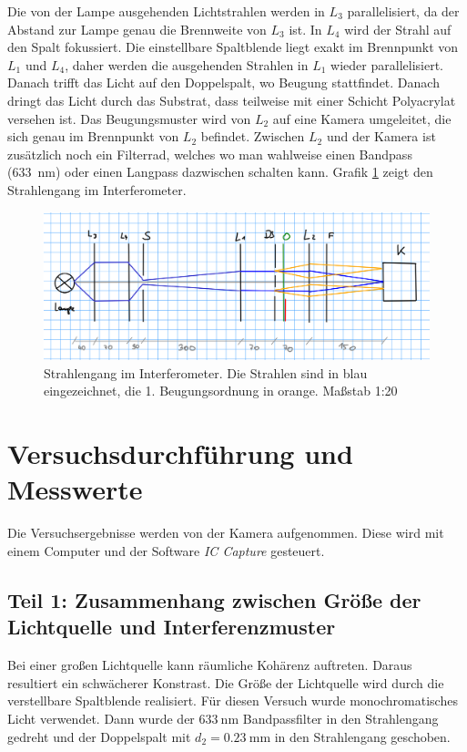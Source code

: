 \documentclass{article}
\begin{document}
Die von der Lampe ausgehenden Lichtstrahlen werden in $L_3$ parallelisiert, da der Abstand zur Lampe genau die Brennweite von $L_3$ ist. In $L_4$ wird der Strahl auf den Spalt fokussiert. Die einstellbare Spaltblende liegt exakt im Brennpunkt von $L_1$ und $L_4$, daher werden die ausgehenden Strahlen in $L_1$ wieder parallelisiert. Danach trifft das Licht auf den Doppelspalt, wo Beugung stattfindet. Danach dringt das Licht durch das Substrat, dass teilweise mit einer Schicht Polyacrylat versehen ist. Das Beugungsmuster wird von $L_2$ auf eine Kamera umgeleitet, die sich genau im Brennpunkt von $L_2$ befindet. Zwischen $L_2$ und der Kamera ist zusätzlich noch ein Filterrad, welches wo man wahlweise einen Bandpass (633~nm) oder einen Langpass dazwischen schalten kann. Grafik \ref{fig:strahlen} zeigt den Strahlengang im Interferometer. 

\begin{figure}[H]
\caption{Strahlengang im Interferometer. Die Strahlen sind in blau eingezeichnet, die 1. Beugungsordnung in orange. Maßstab 1:20}
\label{fig:strahlen}
\includegraphics[scale=1]{strahlen.png}
\end{figure}



\section{Versuchsdurchführung und Messwerte}

Die Versuchsergebnisse werden von der Kamera aufgenommen. Diese wird mit einem Computer und der Software \textit{IC Capture} gesteuert.


\subsection{Teil 1: Zusammenhang zwischen Größe der Lichtquelle und Interferenzmuster}

Bei einer großen Lichtquelle kann räumliche Kohärenz auftreten. Daraus resultiert ein schwächerer Konstrast. Die Größe der Lichtquelle wird durch die verstellbare Spaltblende realisiert. Für diesen Versuch wurde monochromatisches Licht verwendet. Dann wurde der $633~$nm Bandpassfilter in den Strahlengang gedreht und der  Doppelspalt mit $d_2 = 0.23~$mm in den Strahlengang geschoben.
\end{document}
